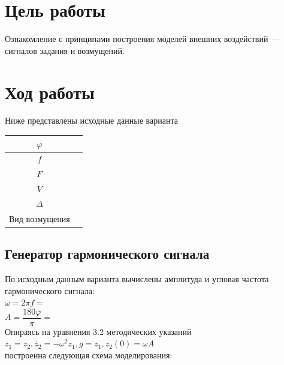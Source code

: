 \documentclass[a4paper,12pt,russian]{article} %
\begin{document}
		

	\renewcommand\titleBotRIGHT{
	\spboxmm{100}{70}{70}{30}{lc}{\parbox{70mm}{
			\normalsize{Преподаватель: Чепинский С.А. }\\ 
			\normalsize{Студенты: Французов Р.А.\\  Донцова М.А.}\\
			\normalsize{Группа: R3325}\\
			\normalsize{Вариант: 18}}}}

		\maketitle
		
		\section{Цель работы}
		Ознакомление с принципами построения моделей внешних воздействий — сигналов задания и возмущений. 
 \\
		
		\section{Ход работы}
Ниже представлены исходные данные варианта\\
\begin{center}
\begin{tabular}{|c|c|}
	\hline
	$\varphi$ &  \\ \hline
	$f$ &  \\ \hline
	$F$ &  \\ \hline
	$V$ &  \\ \hline
	$\Delta$ &  \\ \hline
	Вид возмущения &  \\ \hline
\end{tabular}
\end{center}


\subsection{Генератор гармонического сигнала}
По исходным данным варианта вычислены амплитуда и угловая частота гармонического сигнала:\\
$\omega=2\pi f=$\\
$A=\dfrac{180\varphi}{\pi}=$\\
Опираясь на уравнения 3.2 методических указаний\\
$\dot{z_1}=z_2, \dot{z_2}=-\omega^2z_1, g=z_1, z_2(0)=\omega A$\\
построенна следующая схема моделирования:\\
\end{document}
